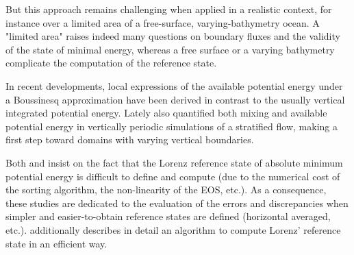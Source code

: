 But this approach remains challenging when applied in a realistic context, for instance over a limited area of a free-surface, varying-bathymetry ocean. A "limited area" raises indeed many questions on boundary fluxes and the validity of the state of minimal energy, whereas a free surface or a varying bathymetry complicate the computation of the reference state.%


In recent developments, %
local expressions of the available potential energy under a Boussinesq approximation have been derived \citep{winters_available_2013} in contrast to the usually vertical integrated potential energy. Lately \cite{howland_mixing_2020,howland_quantifying_2020} also quantified both mixing and available potential energy in vertically periodic simulations of a stratified flow, making a first step toward domains with varying vertical boundaries. %



Both \cite{saenz_estimating_2015} and \cite{tailleux_local_2018} insist on the fact that the Lorenz reference state of absolute minimum potential energy is difficult to define and compute (due to the numerical cost of the sorting algorithm, the non-linearity of the EOS, etc.). As a consequence, these studies are dedicated to the evaluation of the errors and discrepancies when simpler and easier-to-obtain reference states are defined (horizontal averaged, etc.).  \cite{saenz_estimating_2015} additionally describes in detail an algorithm to compute Lorenz' reference state in an efficient way.\\

